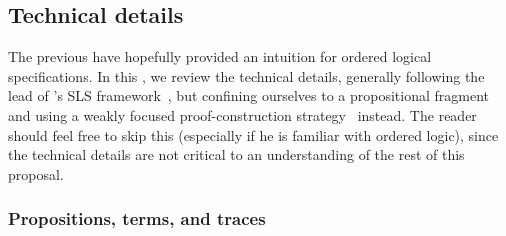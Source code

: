 





% 

\subsection{Technical details}\label{sec:ordered-lp:technical}

The previous  have hopefully provided an intuition for ordered logical specifications.
In this , we review the technical details, generally following the lead of \citeauthor{Simmons:CMU12}'s SLS framework~\autocite*{Simmons:CMU12}, but confining ourselves to a propositional fragment and using a weakly focused proof-construction strategy~\autocite{Simmons+Pfenning:CMU11} instead.
The reader should feel free to skip this  (especially if he is familiar with ordered logic), since the technical details are not critical to an understanding of the rest of this proposal.

\subsubsection{Propositions, terms, and traces}\label{sec:props-terms-traces}

